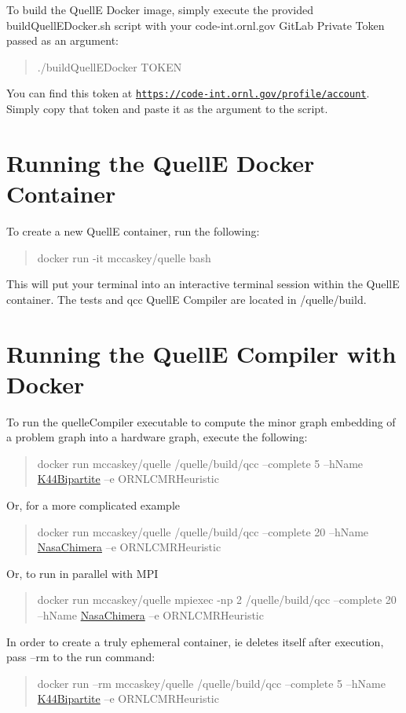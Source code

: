 To build the QuellE Docker image, simply execute the provided build\+Quell\+E\+Docker.\+sh script with your code-\/int.\+ornl.\+gov Git\+Lab Private Token passed as an argument\+:

\begin{quote}
./build\+Quell\+E\+Docker T\+O\+K\+EN \end{quote}


You can find this token at \href{https://code-int.ornl.gov/profile/account}{\tt https\+://code-\/int.\+ornl.\+gov/profile/account}. Simply copy that token and paste it as the argument to the script.

\section*{Running the QuellE Docker Container}

To create a new QuellE container, run the following\+:

\begin{quote}
docker run -\/it mccaskey/quelle bash \end{quote}


This will put your terminal into an interactive terminal session within the QuellE container. The tests and qcc QuellE Compiler are located in /quelle/build.

\section*{Running the QuellE Compiler with Docker}

To run the quelle\+Compiler executable to compute the minor graph embedding of a problem graph into a hardware graph, execute the following\+:

\begin{quote}
docker run mccaskey/quelle /quelle/build/qcc --complete 5 --h\+Name \hyperlink{a00082}{K44\+Bipartite} --e O\+R\+N\+L\+C\+M\+R\+Heuristic \end{quote}


Or, for a more complicated example

\begin{quote}
docker run mccaskey/quelle /quelle/build/qcc --complete 20 --h\+Name \hyperlink{a00089}{Nasa\+Chimera} --e O\+R\+N\+L\+C\+M\+R\+Heuristic \end{quote}


Or, to run in parallel with M\+PI

\begin{quote}
docker run mccaskey/quelle mpiexec -\/np 2 /quelle/build/qcc --complete 20 --h\+Name \hyperlink{a00089}{Nasa\+Chimera} --e O\+R\+N\+L\+C\+M\+R\+Heuristic \end{quote}


In order to create a truly ephemeral container, ie deletes itself after execution, pass --rm to the run command\+:

\begin{quote}
docker run --rm mccaskey/quelle /quelle/build/qcc --complete 5 --h\+Name \hyperlink{a00082}{K44\+Bipartite} --e O\+R\+N\+L\+C\+M\+R\+Heuristic\end{quote}

